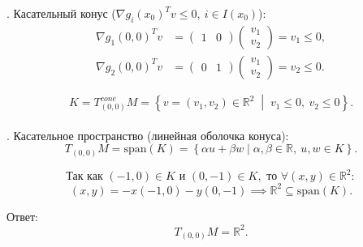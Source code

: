 \documentclass[12pt]{article}
\begin{document}
. Касательный конус (\(\nabla g_i(x_0)^T v \le 0,\ i \in I(x_0)\)):
\begin{align*}
\nabla g_1(0, 0)^T v &= \begin{pmatrix} 1 & 0 \end{pmatrix} \begin{pmatrix} v_1 \\ v_2 \end{pmatrix} = v_1 \le 0, \\[4pt]
\nabla g_2(0, 0)^T v &= \begin{pmatrix} 0 & 1 \end{pmatrix} \begin{pmatrix} v_1 \\ v_2 \end{pmatrix} = v_2 \le 0.
\end{align*}

\[
K = T^{cone}_{(0,0)}M = \left\{ v = (v_1, v_2) \in \mathbb{R}^2 \;\middle|\; v_1 \le 0,\ v_2 \le 0 \right\}.
\]\\

. Касательное пространство (линейная оболочка конуса):
\[
T_{(0,0)}M = \text{span}(K) = \left\{ \alpha u + \beta w \mid \alpha, \beta \in \mathbb{R},\ u, w \in K \right\}.
\]

\[
\text{Так как } (-1, 0) \in K \text{ и } (0, -1) \in K, \text{ то } \forall (x, y) \in \mathbb{R}^2:
\]
\[
(x, y) = -x(-1, 0) - y(0, -1) \implies \mathbb{R}^2 \subseteq \text{span}(K).
\]

\noindent Ответ:
\[
T_{(0,0)}M = \mathbb{R}^2.
\]
\end{document}
